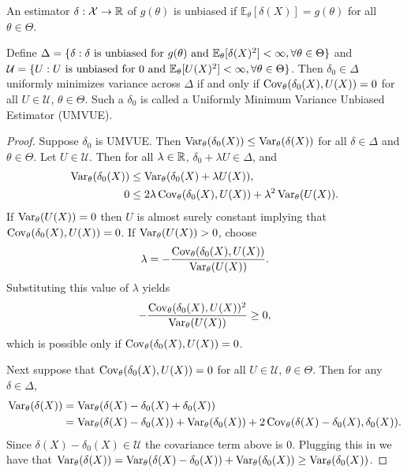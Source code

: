\begin{definition}
	An estimator $\delta : \mathcal X \to \mathbb{R}$ of $g(\theta)$ is unbiased if $\mathbb E_\theta[\delta(X)] = g(\theta)$ for all $\theta \in \Theta$.
\end{definition}

\begin{theorem}
	Define $\Delta = \{\delta : \delta \text{ is unbiased for } g(\theta) \text{ and } \mathbb{E}_\theta[\delta(X)^2] < \infty, \forall \theta \in \Theta \}$ and \\ $\mathcal U = \{ U :  U \text{ is unbiased for } 0 \text{ and } \mathbb{E}_\theta[U(X)^2] < \infty, \forall \theta \in \Theta \}$. Then $\delta_0 \in \Delta$ uniformly minimizes variance across $\Delta$ if and only if $\operatorname{Cov}_\theta(\delta_0(X), U(X)) = 0$ for all $U \in \mathcal U$, $\theta \in \Theta$. Such a $\delta_0$ is called a Uniformly Minimum Variance Unbiased Estimator (UMVUE).
\end{theorem}

\begin{proof}
	Suppose $\delta_0$ is UMVUE. Then $\operatorname{Var}_\theta(\delta_0(X)) \le \operatorname{Var}_\theta(\delta(X))$ for all $\delta \in \Delta$ and $\theta \in \Theta$. Let $U \in \mathcal U$. Then for all $\lambda \in \mathbb{R}$, $\delta_0 + \lambda U \in \Delta$, and
	\begin{align*}
	\operatorname{Var}_\theta(\delta_0(X))
	&\le \operatorname{Var}_\theta(\delta_0(X)+\lambda U(X)), \\
	0
	&\le 2\lambda\operatorname{Cov}_\theta(\delta_0(X),U(X))
	+\lambda^2\operatorname{Var}_\theta(U(X)).
	\end{align*}
	If $\operatorname{Var}_\theta(U(X)) = 0$ then $U$ is almost surely constant implying that $\operatorname{Cov}_\theta(\delta_0(X), U(X)) = 0$. If $\operatorname{Var}_\theta(U(X)) > 0$, choose
	\[
	\lambda
	=-\frac{\operatorname{Cov}_\theta(\delta_0(X),U(X))}
	        {\operatorname{Var}_\theta(U(X))}.
	\]
	Substituting this value of $\lambda$ yields
	\[
	-\frac{\operatorname{Cov}_\theta(\delta_0(X),U(X))^2}
	       {\operatorname{Var}_\theta(U(X))}
	\ge 0,
	\]
	which is possible only if $\operatorname{Cov}_\theta(\delta_0(X),U(X))=0$.
	
	\medskip \noindent
	Next suppose that $\operatorname{Cov}_\theta(\delta_0(X), U(X)) = 0$ for all $U \in \mathcal U$, $\theta \in \Theta$. Then for any $\delta \in \Delta$,
	\begin{align*}
	\operatorname{Var}_\theta(\delta(X)) &= \operatorname{Var}_\theta(\delta(X) - \delta_0(X) + \delta_0(X)) \\
	&= \operatorname{Var}_\theta(\delta(X) - \delta_0(X)) + \operatorname{Var}_\theta(\delta_0(X)) + 2\operatorname{Cov}_\theta(\delta(X) - \delta_0(X), \delta_0(X)). 
	\end{align*}
	Since $\delta(X) - \delta_0(X) \in \mathcal U$ the covariance term above is $0$. Plugging this in we have that $\operatorname{Var}_\theta(\delta(X)) = \operatorname{Var}_\theta(\delta(X) - \delta_0(X)) + \operatorname{Var}_\theta(\delta_0(X)) \ge \operatorname{Var}_\theta(\delta_0(X))$. 
\end{proof}


